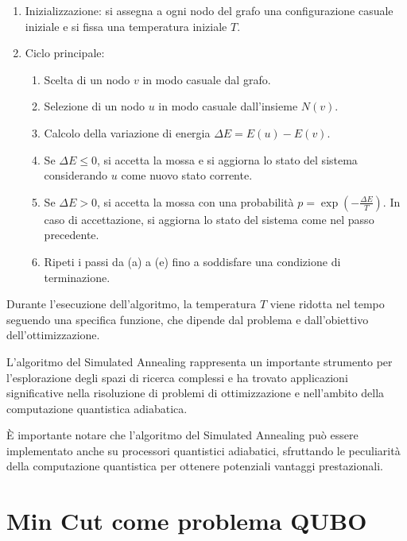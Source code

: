 \documentclass{article}
\begin{document}
\begin{enumerate}
    \item Inizializzazione: si assegna a ogni nodo del grafo una configurazione casuale iniziale e si fissa una temperatura iniziale $T$.
    \item Ciclo principale:
    \begin{enumerate}
        \item Scelta di un nodo $v$ in modo casuale dal grafo.
        \item Selezione di un nodo $u$ in modo casuale dall'insieme $N(v)$.
        \item Calcolo della variazione di energia $\Delta E = E(u) - E(v)$.
        \item Se $\Delta E \leq 0$, si accetta la mossa e si aggiorna lo stato del sistema considerando $u$ come nuovo stato corrente.
        \item Se $\Delta E > 0$, si accetta la mossa con una probabilità $p = \exp(-\frac{\Delta E}{T})$. In caso di accettazione, si aggiorna lo stato del sistema come nel passo precedente.
        \item Ripeti i passi da (a) a (e) fino a soddisfare una condizione di terminazione.
    \end{enumerate}
\end{enumerate}

Durante l'esecuzione dell'algoritmo, la temperatura $T$ viene ridotta nel tempo seguendo una specifica funzione, che dipende dal problema e dall'obiettivo dell'ottimizzazione.

L'algoritmo del Simulated Annealing rappresenta un importante strumento per l'esplorazione degli spazi di ricerca complessi e ha trovato applicazioni significative nella risoluzione di problemi di ottimizzazione e nell'ambito della computazione quantistica adiabatica.

È importante notare che l'algoritmo del Simulated Annealing può essere implementato anche su processori quantistici adiabatici, sfruttando le peculiarità della computazione quantistica per ottenere potenziali vantaggi prestazionali.

\section{Min Cut come problema QUBO}
\end{document}
